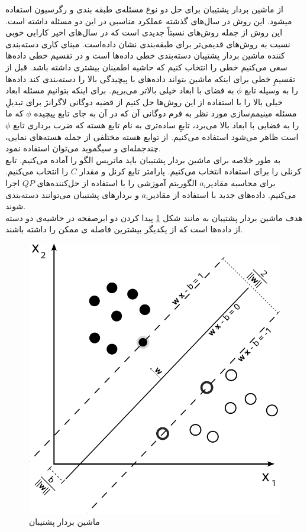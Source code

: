 \noindent
از ماشین بردار پشتیبان برای حل دو نوع مسئله‌ی طبقه بندی و رگرسیون استفاده میشود. این روش در سال‌های گذشته عملکرد مناسبی در این دو مسئله داشته است.
این روش از جمله روش‌های نسبتاً جدیدی است که در سال‌های اخیر کارایی خوبی نسبت به روش‌های قدیمی‌تر برای طبقه‌بندی نشان داده‌است. مبنای کاری دسته‌بندی کننده ماشین بردار پشتیبان دسته‌بندی خطی داده‌ها است و در تقسیم خطی داده‌ها سعی می‌کنیم خطی را انتخاب کنیم که حاشیه اطمینان بیشتری داشته باشد. قبل از تقسیمِ خطی برای اینکه ماشین بتواند داده‌های با پیچیدگی بالا را دسته‌بندی کند داده‌ها را به وسیله تابع $\phi$ به فضای با ابعاد خیلی بالاتر می‌بریم. برای اینکه بتوانیم مسئله ابعاد خیلی بالا را با استفاده از این روش‌ها حل کنیم از قضیه دوگانی لاگرانژ برای تبدیلِ مسئله مینیمم‌سازی مورد نظر به فرم دوگانی آن که در آن به جای تابع پیچیده $\phi$ که ما را به فضایی با ابعاد بالا می‌برد، تابعِ ساده‌تری به نام تابع هسته که ضرب برداری تابع $\phi$ است ظاهر می‌شود استفاده می‌کنیم. از توابع هسته مختلفی از جمله هسته‌های نمایی، چندجمله‌ای و سیگموید می‌توان استفاده نمود.
\\
به طور خلاصه برای ماشین بردار پشتیبان باید 
ماتریس الگو را آماده می‌کنیم. تابع کرنلی را برای استفاده انتخاب می‌کنیم. پارامتر تابع کرنل و مقدار $C$ را انتخاب می‌کنیم. برای محاسبه مقادیر$a_i$ الگوریتم آموزشی را با استفاده از حل‌کننده‌های $QP$ اجرا می‌کنیم. داده‌های جدید با استفاده از مقادیر$a_i$ و بردارهای پشتیبان می‌توانند دسته‌بندی شوند.
\\
هدف ماشین بردار پشتیبان به مانند شکل \ref{fig:svm} پیدا کردن دو ابرصفحه در حاشیه‌ی دو دسته از داده‌ها است که از یکدیگر بیشترین فاصله ی ممکن را داشته باشند.

\begin{figure}[ht!]
    \begin{center}
        \includegraphics[width=12cm]{images/svm.png}
    \end{center}
    \caption[ماشین بردار پشتیبان]{ماشین بردار پشتیبان}
    \label{fig:svm}
    \end{figure}

